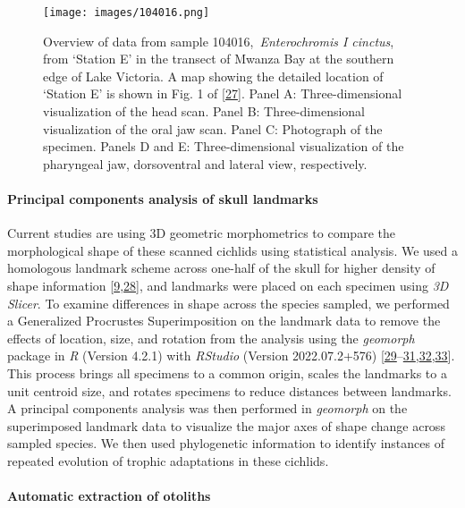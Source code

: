\begin{figure}
\hypertarget{fig:104016}{%
\centering
\texttt{[image: images/104016.png]}
\caption{Overview of data from sample 104016,~\emph{Enterochromis I cinctus}, from `Station E' in the transect of Mwanza Bay at the southern edge of Lake Victoria.
A map showing the detailed location of `Station E' is shown in Fig. 1 of {[}\protect\hyperlink{ref-JtHcU2O2}{27}{]}.
Panel A: Three-dimensional visualization of the head scan.
Panel B: Three-dimensional visualization of the oral jaw scan.
Panel C: Photograph of the specimen.
Panels D and E: Three-dimensional visualization of the pharyngeal jaw, dorsoventral and lateral view, respectively.}\label{fig:104016}
}
\end{figure}

\hypertarget{principal-components-analysis-of-skull-landmarks}{%
\paragraph{Principal components analysis of skull landmarks}\label{principal-components-analysis-of-skull-landmarks}}

Current studies are using 3D geometric morphometrics to compare the morphological shape of these scanned cichlids using statistical analysis.
We used a homologous landmark scheme across one-half of the skull for higher density of shape information {[}\protect\hyperlink{ref-BDrCSu8p}{9},\protect\hyperlink{ref-15FafMZm5}{28}{]}, and landmarks were placed on each specimen using \emph{3D Slicer}.
To examine differences in shape across the species sampled, we performed a Generalized Procrustes Superimposition on the landmark data to remove the effects of location, size, and rotation from the analysis using the \emph{geomorph} package in \emph{R} (Version 4.2.1) with \emph{RStudio} (Version 2022.07.2+576) {[}\protect\hyperlink{ref-VPUOQA2P}{29}--\protect\hyperlink{ref-EwNL0C0Y}{31},\protect\hyperlink{ref-whEyWyQh}{32},\protect\hyperlink{ref-QfVloFVu}{33}{]}.
This process brings all specimens to a common origin, scales the landmarks to a unit centroid size, and rotates specimens to reduce distances between landmarks.
A principal components analysis was then performed in \emph{geomorph} on the superimposed landmark data to visualize the major axes of shape change across sampled species.
We then used phylogenetic information to identify instances of repeated evolution of trophic adaptations in these cichlids.

\hypertarget{automatic-extraction-of-otoliths}{%
\paragraph{Automatic extraction of otoliths}\label{automatic-extraction-of-otoliths}}

